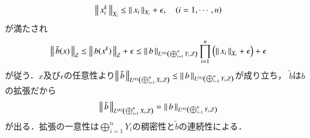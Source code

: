 \begin{prf}
\begin{align}
			\Norm{x^k_i}{X_i} \leq \Norm{x_i}{X_i} + \epsilon,
			\quad (i=1,\cdots,n)
		\end{align}
		が満たされ
		\begin{align}
			\Norm{\tilde{b}(x)}{Z} \leq \Norm{b(x^k)}{Z} + \epsilon
			\leq \Norm{b}{\ContLn{\bigoplus_{i=1}^n Y_i}{Z}{n}} \prod_{i=1}^n \left( \Norm{x_i}{X_i} + \epsilon \right) + \epsilon
		\end{align}
		が従う．$x$及び$\epsilon$の任意性より$\Norm{\tilde{b}}{\ContLn{\bigoplus_{i=1}^n X_i}{Z}{n}}
		\leq \Norm{b}{\ContLn{\bigoplus_{i=1}^n Y_i}{Z}{n}}$が成り立ち，
		$\tilde{b}$は$b$の拡張だから
		\begin{align}
			\Norm{\tilde{b}}{\ContLn{\bigoplus_{i=1}^n X_i}{Z}{n}}
			= \Norm{b}{\ContLn{\bigoplus_{i=1}^n Y_i}{Z}{n}}
		\end{align}
		が出る．拡張の一意性は$\bigoplus_{i=1}^n Y_i$の稠密性と$\tilde{b}$の連続性による．
		\QED
	\end{prf}